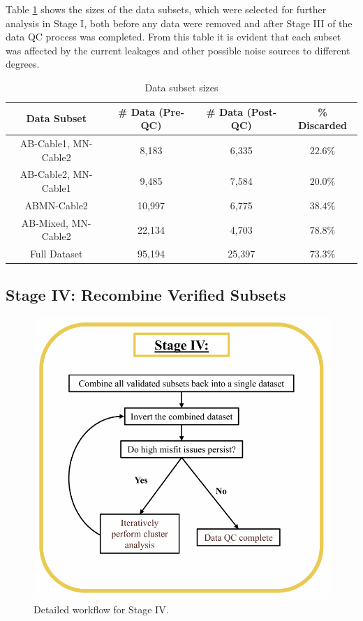 \documentclass[final,authoryear,5p,times,twocolumn]{elsarticle}
\begin{document}
Table \ref{tab:DataSubsetSizes} shows the sizes of the data subsets, which were selected for further analysis in Stage I, both before any data were removed and after Stage III of the data QC process was completed. From this table it is evident that each subset was affected by the current leakages and other possible noise sources to different degrees.

\begin{table}[!ht]
\scriptsize
\begin{center}
  \begin{tabular}{| c | c | c | c |}
    \hline
    \bf{Data Subset} & \bf{\# Data (Pre-QC)} & \bf{\# Data (Post-QC)} & \bf{\% Discarded} \\
    \hline
    AB-Cable1, MN-Cable2 & 8,183 & 6,335 & $22.6 \%$ \\
    \hline
    AB-Cable2, MN-Cable1 & 9,485 & 7,584 & $20.0 \%$\\
    \hline
    ABMN-Cable2 & 10,997 & 6,775 & $38.4 \%$\\
    \hline
    AB-Mixed, MN-Cable2  & 22,134 & 4,703 & $78.8 \%$\\
    \hline
    Full Dataset  & 95,194 & 25,397 & $73.3 \%$\\
    \hline
  \end{tabular}
\caption{Data subset sizes}
\label{tab:DataSubsetSizes}
\end{center}
\end{table}

\subsection{Stage IV: Recombine Verified Subsets}
\label{Data_Quality_Control:StageIV_Recombine_Subsets}

\begin{figure} [!ht]
\begin{center}
   \includegraphics[trim=0cm 0cm 0cm 0cm, clip=true,width=0.75\linewidth]{./Figures/Fig16.pdf}
\end{center}
\caption{Detailed workflow for Stage IV.}
\label{fig:DataQC_workflow_StageIV}
\end{figure}
\end{document}
